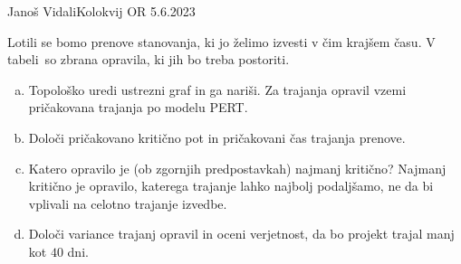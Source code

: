 \begin{naloga}{Janoš Vidali}{Kolokvij OR 5.6.2023}
\begin{vprasanje}
Lotili se bomo prenove stanovanja, ki jo želimo izvesti v čim krajšem času.
V tabeli~\tab so zbrana opravila, ki jih bo treba postoriti.

\begin{enumerate}[(a)]
\item Topološko uredi ustrezni graf in ga nariši.
Za trajanja opravil vzemi pričakovana trajanja po modelu PERT.

\item Določi pričakovano kritično pot in pričakovani čas trajanja prenove.

\item Katero opravilo je (ob zgornjih predpostavkah) najmanj kritično?
Najmanj kritično je opravilo, katerega trajanje lahko najbolj podaljšamo,
ne da bi vplivali na celotno trajanje izvedbe.

\item Določi variance trajanj opravil in oceni ve\-rjet\-nost,
da bo projekt trajal manj kot $40$ dni.
\end{enumerate}
%
\begin{tabela}
\end{tabela}
\end{vprasanje}


\end{naloga}
